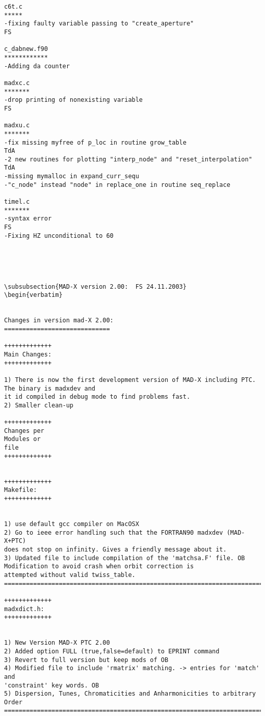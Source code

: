 \begin{verbatim}
c6t.c
*****
-fixing faulty variable passing to "create_aperture"                     FS

c_dabnew.f90
************
-Adding da counter

madxc.c
*******
-drop printing of nonexisting variable                                   FS

madxu.c
*******
-fix missing myfree of p_loc in routine grow_table                   TdA
-2 new routines for plotting "interp_node" and "reset_interpolation" TdA
-missing mymalloc in expand_curr_sequ
-"c_node" instead "node" in replace_one in routine seq_replace

timel.c
*******
-syntax error                                                             FS
-Fixing HZ unconditional to 60





\subsubsection{MAD-X version 2.00:  FS 24.11.2003}
\begin{verbatim}


Changes in version mad-X 2.00:
=============================

+++++++++++++
Main Changes:
+++++++++++++

1) There is now the first development version of MAD-X including PTC. The binary is madxdev and 
it id compiled in debug mode to find problems fast.
2) Smaller clean-up

+++++++++++++
Changes per
Modules or
file
+++++++++++++


+++++++++++++
Makefile: 
+++++++++++++


1) use default gcc compiler on MacOSX
2) Go to ieee error handling such that the FORTRAN90 madxdev (MAD-X+PTC)
does not stop on infinity. Gives a friendly message about it.
3) Updated file to include compilation of the 'matchsa.F' file. OB
Modification to avoid crash when orbit correction is
attempted without valid twiss_table.
=============================================================================

+++++++++++++
madxdict.h: 
+++++++++++++


1) New Version MAD-X PTC 2.00
2) Added option FULL (true,false=default) to EPRINT command
3) Revert to full version but keep mods of OB
4) Modified file to include 'rmatrix' matching. -> entries for 'match' and
'constraint' key words. OB
5) Dispersion, Tunes, Chromaticities and Anharmonicities to arbitrary Order
=============================================================================


\end{verbatim}
